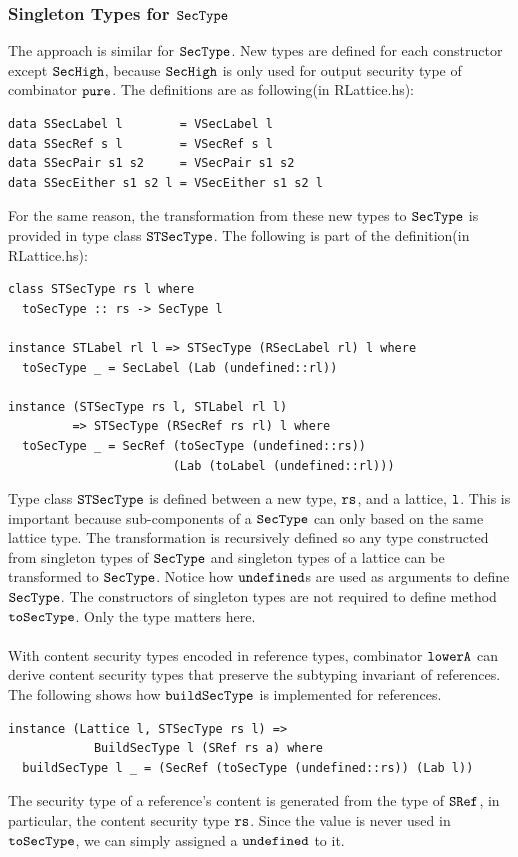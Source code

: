 \documentclass[a4paper]{report}
\newcommand{\co}[1]{$\cod{#1}$}
\begin{document}
\subsubsection{Singleton Types for \co{SecType}}
The approach is similar for \co{SecType}. New types are defined for each constructor
except \co{SecHigh}, because \co{SecHigh} is only used for output security type of
combinator \co{pure}. The definitions are as following(in RLattice.hs):
\begin{Verbatim}[fontsize=\footnotesize]
data SSecLabel l        = VSecLabel l
data SSecRef s l        = VSecRef s l
data SSecPair s1 s2     = VSecPair s1 s2
data SSecEither s1 s2 l = VSecEither s1 s2 l
\end{Verbatim}
For the same reason, the transformation from these new types to \co{SecType} is
provided in type class \co{STSecType}. The following is part of the definition(in RLattice.hs):
\begin{Verbatim}[fontsize=\footnotesize]
class STSecType rs l where
  toSecType :: rs -> SecType l

instance STLabel rl l => STSecType (RSecLabel rl) l where
  toSecType _ = SecLabel (Lab (undefined::rl))

instance (STSecType rs l, STLabel rl l)
         => STSecType (RSecRef rs rl) l where
  toSecType _ = SecRef (toSecType (undefined::rs)) 
                       (Lab (toLabel (undefined::rl)))
\end{Verbatim}
Type class \co{STSecType} is defined between a new type, \co{rs}, and
a lattice, \co{l}. This is important because sub-components of a \co{SecType} can only
based on the same lattice type.
The transformation is recursively defined so any type constructed from
singleton types of \co{SecType} and singleton types of a lattice can be transformed to \co{SecType}.
Notice how \co{undefined}s are used as arguments to define \co{SecType}.
The constructors of singleton types are not required to define method \co{toSecType}.
Only the type matters here.

\paragraph{}
With content security types encoded in reference types, combinator \co{lowerA}
can derive content security types that preserve the subtyping invariant of references.
The following shows how \co{buildSecType} is implemented for references.
\begin{Verbatim}[fontsize=\footnotesize]
instance (Lattice l, STSecType rs l) =>
            BuildSecType l (SRef rs a) where
  buildSecType l _ = (SecRef (toSecType (undefined::rs)) (Lab l))
\end{Verbatim}
The security type of a reference's content is generated from the type of \co{SRef},
in particular, the content security type \co{rs}. Since the value is never used in \co{toSecType},
we can simply assigned a \co{undefined} to it.
\end{document}
